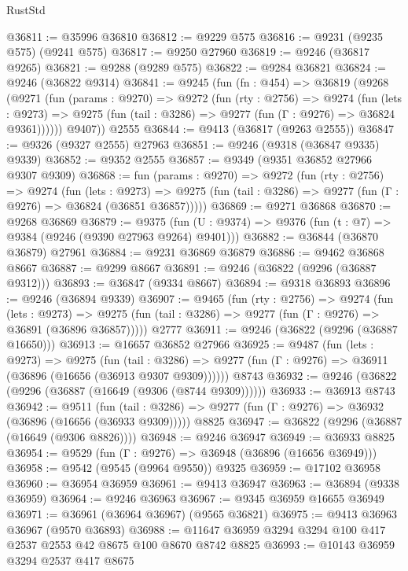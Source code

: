 \begin{lexlean}{RustStd}
\begin{coremodule}
@36811 := @35996 @36810
@36812 := @9229 @575
@36816 := @9231 (@9235 @575) (@9241 @575)
@36817 := @9250 @27960
@36819 := @9246 (@36817 @9265)
@36821 := @9288 (@9289 @575)
@36822 := @9284 @36821
@36824 := @9246 (@36822 @9314)
@36841 := @9245
    (fun (fn : @454) =>
    @36819
      (@9268
        (@9271
          (fun (params : @9270) =>
          @9272
            (fun (rty : @2756) =>
            @9274
              (fun (lets : @9273) =>
              @9275 (fun (tail : @3286) => @9277 (fun (Γ : @9276) => @36824 @9361))))))
        @9407))
    @2555
@36844 := @9413 (@36817 (@9263 @2555))
@36847 := @9326 (@9327 @2555) @27963
@36851 := @9246 (@9318 (@36847 @9335) @9339)
@36852 := @9352 @2555
@36857 := @9349 (@9351 @36852 @27966 @9307 @9309)
@36868 := fun (params : @9270) =>
  @9272
    (fun (rty : @2756) =>
    @9274
      (fun (lets : @9273) =>
      @9275 (fun (tail : @3286) => @9277 (fun (Γ : @9276) => @36824 (@36851 @36857)))))
@36869 := @9271 @36868
@36870 := @9268 @36869
@36879 := @9375
    (fun (U : @9374) => @9376 (fun (t : @7) => @9384 (@9246 (@9390 @27963 @9264) @9401)))
@36882 := @36844 (@36870 @36879) @27961
@36884 := @9231 @36869 @36879
@36886 := @9462 @36868 @8667
@36887 := @9299 @8667
@36891 := @9246 (@36822 (@9296 (@36887 @9312)))
@36893 := @36847 (@9334 @8667)
@36894 := @9318 @36893
@36896 := @9246 (@36894 @9339)
@36907 := @9465
    (fun (rty : @2756) =>
    @9274
      (fun (lets : @9273) =>
      @9275 (fun (tail : @3286) => @9277 (fun (Γ : @9276) => @36891 (@36896 @36857)))))
    @2777
@36911 := @9246 (@36822 (@9296 (@36887 @16650)))
@36913 := @16657 @36852 @27966
@36925 := @9487
    (fun (lets : @9273) =>
    @9275
      (fun (tail : @3286) =>
      @9277 (fun (Γ : @9276) => @36911 (@36896 (@16656 (@36913 @9307 @9309))))))
    @8743
@36932 := @9246 (@36822 (@9296 (@36887 (@16649 (@9306 (@8744 @9309))))))
@36933 := @36913 @8743
@36942 := @9511
    (fun (tail : @3286) => @9277 (fun (Γ : @9276) => @36932 (@36896 (@16656 (@36933 @9309)))))
    @8825
@36947 := @36822 (@9296 (@36887 (@16649 (@9306 @8826))))
@36948 := @9246 @36947
@36949 := @36933 @8825
@36954 := @9529 (fun (Γ : @9276) => @36948 (@36896 (@16656 @36949)))
@36958 := @9542 (@9545 (@9964 @9550)) @9325
@36959 := @17102 @36958
@36960 := @36954 @36959
@36961 := @9413 @36947
@36963 := @36894 (@9338 @36959)
@36964 := @9246 @36963
@36967 := @9345 @36959 @16655 @36949
@36971 := @36961 (@36964 @36967) (@9565 @36821)
@36975 := @9413 @36963 @36967 (@9570 @36893)
@36988 := @11647 @36959 @3294 @3294 @100 @417 @2537 @2553 @42 @8675 @100 @8670 @8742 @8825
@36993 := @10143 @36959 @3294 @2537 @417 @8675

\end{coremodule}
\end{lexlean}
